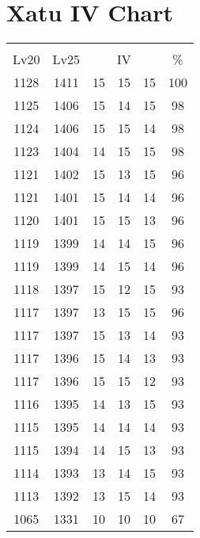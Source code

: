 \documentclass{article}%
\begin{document}
%
\normalsize%
\section{Xatu IV Chart}%
\label{sec:Xatu IV Chart}%
\renewcommand{\arraystretch}{1.5}%
\begin{tabular}{|c|c|c|c|c|c|}%
\hline%
\multicolumn{6}{|c|}{\textcolor{white}{ 
\linebreak{Xatu}
}%
\cellcolor{black}}\\%
\multicolumn{1}{|c}{Lv20}&\multicolumn{1}{c|}{Lv25}&\multicolumn{3}{c|}{IV}&\multicolumn{1}{|c|}{\%}\\%
\hline%
\rowcolor{color100}%
1128&1411&15&15&15&100\\%
\hline%
\rowcolor{color98}%
1125&1406&15&14&15&98\\%
\hline%
\rowcolor{color98}%
1124&1406&15&15&14&98\\%
\hline%
\rowcolor{color98}%
1123&1404&14&15&15&98\\%
\hline%
\rowcolor{color96}%
1121&1402&15&13&15&96\\%
\hline%
\rowcolor{color96}%
1121&1401&15&14&14&96\\%
\hline%
\rowcolor{color96}%
1120&1401&15&15&13&96\\%
\hline%
\rowcolor{color96}%
1119&1399&14&14&15&96\\%
\hline%
\rowcolor{color96}%
1119&1399&14&15&14&96\\%
\hline%
\rowcolor{color93}%
1118&1397&15&12&15&93\\%
\hline%
\rowcolor{color96}%
1117&1397&13&15&15&96\\%
\hline%
\rowcolor{color93}%
1117&1397&15&13&14&93\\%
\hline%
\rowcolor{color93}%
1117&1396&15&14&13&93\\%
\hline%
\rowcolor{color93}%
1117&1396&15&15&12&93\\%
\hline%
\rowcolor{color93}%
1116&1395&14&13&15&93\\%
\hline%
\rowcolor{color93}%
1115&1395&14&14&14&93\\%
\hline%
\rowcolor{color93}%
1115&1394&14&15&13&93\\%
\hline%
\rowcolor{color93}%
1114&1393&13&14&15&93\\%
\hline%
\rowcolor{color93}%
1113&1392&13&15&14&93\\%
\hline%
\rowcolor{color91}%
1065&1331&10&10&10&67\\%
\end{tabular}

%
\end{document}
